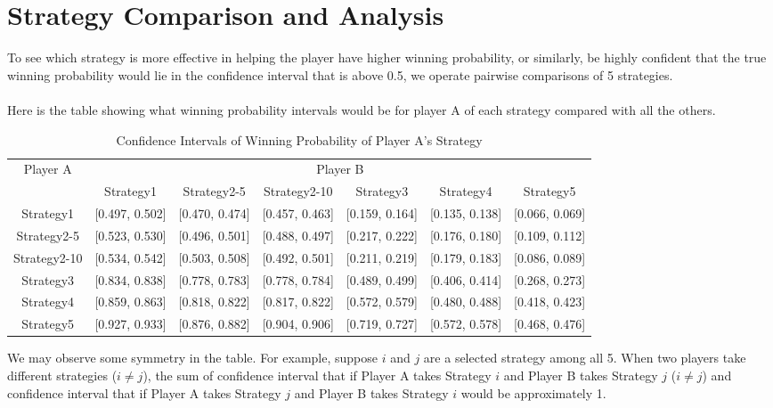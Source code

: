 \documentclass[12pt]{article}
\begin{document}
\section{Strategy Comparison and Analysis}
To see which strategy is more effective in helping the player have higher winning probability, or similarly, be highly confident that the true winning probability would lie in the confidence interval that is above 0.5, we operate pairwise comparisons of 5 strategies.\\\\
Here is the table showing what winning probability intervals would be for player A of each strategy compared with all the others.
\begin{table}[H]
  \begin{center}
  \caption*{Confidence Intervals of Winning Probability of Player A’s Strategy}
    \begin{tabular}{|c|c|c|c|c|c|c|}
    \hline
    \multirow{2}{*}{Player A} & \multicolumn{6}{c|}{Player B} \\
    \cline{2-7}
    & Strategy1 & Strategy2-5 & Strategy2-10 & Strategy3 &  Strategy4 & Strategy5\\
    \hline
    Strategy1 & [0.497, 0.502] & [0.470, 0.474]& [0.457, 0.463]& [0.159, 0.164] & [0.135, 0.138] & [0.066, 0.069]\\
    \hline
    Strategy2-5 & \color{red}[0.523, 0.530] & [0.496, 0.501]& [0.488, 0.497] & [0.217, 0.222] & [0.176, 0.180] & [0.109, 0.112]\\
    \hline
    Strategy2-10 & \color{red}[0.534, 0.542] & \color{red}[0.503, 0.508] & [0.492, 0.501] & [0.211, 0.219] & [0.179, 0.183] & [0.086, 0.089] \\
    \hline
    Strategy3 & \color{red}[0.834, 0.838] & \color{red}[0.778, 0.783] & \color{red}[0.778, 0.784] & [0.489, 0.499]& [0.406, 0.414] & [0.268, 0.273]\\
    \hline
    Strategy4 & \color{red}[0.859, 0.863] & \color{red}[0.818, 0.822]& \color{red}[0.817, 0.822] & \color{red}[0.572, 0.579] & [0.480, 0.488] & [0.418, 0.423]\\
    \hline
    Strategy5 & \color{red}[0.927, 0.933] & \color{red}[0.876, 0.882]& \color{red} [0.904, 0.906]& \color{red} [0.719, 0.727]& \color{red}[0.572, 0.578]& [0.468, 0.476]\\
    \hline
    \end{tabular}
  \end{center}
\end{table}
We may observe some symmetry in the table. For example, suppose $i$ and $j$ are a selected strategy among all 5. When two players take different strategies ($i \neq j$), the sum of confidence interval that if Player A takes Strategy $i$ and Player B takes Strategy $j$ ($i \neq j$) and confidence interval that if Player A takes Strategy $j$ and Player B takes Strategy $i$  would be approximately 1. \\\\
\end{document}
